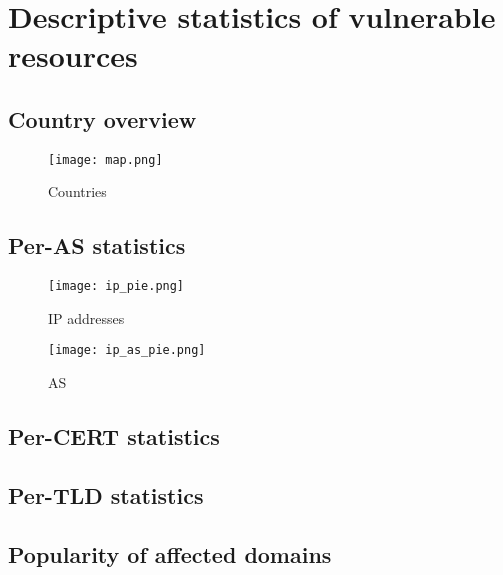 \section{Descriptive statistics of vulnerable resources}
\subsection{Country overview}

\begin{figure}[!hbt]
\centering
\texttt{[image: map.png]}
\caption{Countries}
\end{figure}

\subsection{Per-AS statistics}
\begin{figure}[!hbt]
\centering
\texttt{[image: ip\_pie.png]}
\caption{IP addresses}
\end{figure}

\begin{figure}[!hbt]
\centering
\texttt{[image: ip\_as\_pie.png]}
\caption{AS}
\end{figure}

\subsection{Per-CERT statistics}
\subsection{Per-TLD statistics}
\subsection{Popularity of affected domains}
